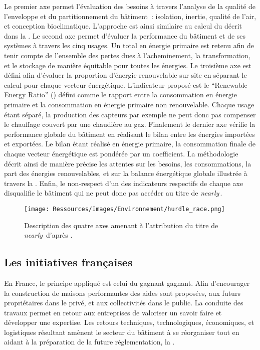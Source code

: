 Le premier axe permet l’évaluation des besoins à travers l’analyse
de la qualité de l’enveloppe et du partitionnement du bâtiment~: isolation, inertie, qualité de l’air,
et conception bioclimatique. L’approche est ainsi similaire au calcul du  décrit dans
la .
Le second axe permet d’évaluer la performance du bâtiment et de ses systèmes à travers les
cinq usages. Un total en énergie primaire est retenu afin de tenir compte de l’ensemble
des pertes dues à l’acheminement, la transformation, et le stockage de manière équitable
pour toutes les énergies.
Le troisième axe est défini afin d’évaluer la proportion d’énergie renouvelable sur site en séparant
le calcul pour chaque vecteur énergétique. L’indicateur proposé est le \enquote{Renewable Energy Ratio}
() défini comme le rapport entre la consommation en énergie primaire et la consommation
en énergie primaire non renouvelable. Chaque usage étant séparé, la production des
capteurs  par exemple ne peut donc pas compenser le chauffage couvert par une chaudière
au gaz.
Finalement le dernier axe vérifie la performance globale du bâtiment en réalisant
le bilan entre les énergies importées et exportées. Le bilan étant réalisé en énergie
primaire, la consommation finale de chaque vecteur énergétique est pondérée par un
coefficient.
La méthodologie décrit ainsi de manière précise les attentes sur les besoins, les
consommations, la part des énergies renouvelables, et sur la balance énergétique globale
illustrée à travers la .
Enfin, le non-respect d’un des indicateurs respectifs de chaque axe disqualifie le bâtiment
qui ne peut donc pas accéder au titre de \textit{nearly}\,.

\begin{figure}
    \centering
    \texttt{[image: Ressources/Images/Environnement/hurdle\_race.png]}
    \caption[Description des quatre axes amenant à l’attribution du titre de
             \textit{nearly}\,]
            {Description des quatre axes amenant à l’attribution du titre de
             \textit{nearly}\, d’après \textcite{Zirngibl2014}.}
    \label{fig:attribution_nZEB}
\end{figure}


\subsection{Les initiatives françaises} %
\label{sub:les_initiatives_francaises}
En France, le principe appliqué est celui du gagnant gagnant. Afin d’encourager la
construction de maisons performantes des aides sont proposées, aux futurs propriétaires
dans le privé, et aux collectivités dans le public. La conduite des travaux permet en retour aux entreprises de valoriser un
savoir faire et développer une expertise. Les retours techniques, technologiques,
économiques, et logistiques résultant amènent le secteur du bâtiment à se réorganiser tout
en aidant à la préparation de la future réglementation, la .

